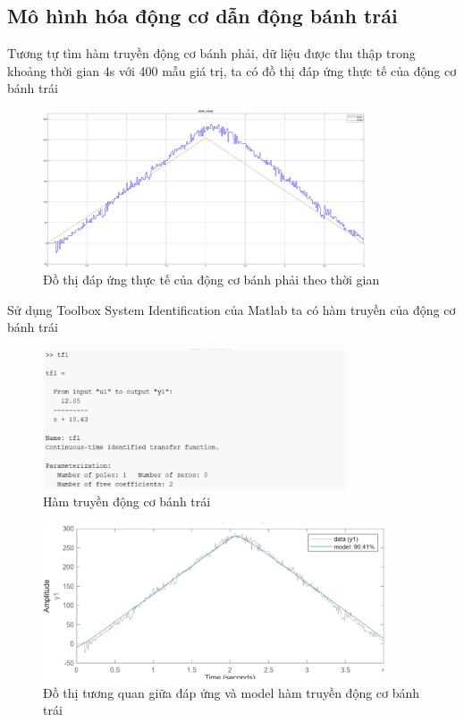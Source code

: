           \subsection{Mô hình hóa động cơ dẫn động bánh trái}
               \hspace*{0.6cm}Tương tự tìm hàm truyền động cơ bánh phải, dữ liệu được thu thập trong khoảng thời gian 4s với 400 mẫu giá trị, ta có đồ thị đáp ứng thực tế của động cơ bánh trái
               \begin{figure}[H]
                    \centering
                    \includegraphics[width=0.85\textwidth]{pictures/chapter5/CJGB2_response.png}
                    \caption{Đồ thị đáp ứng thực tế của động cơ bánh phải theo thời gian}
                    \label{CJGB2_response}
               \end{figure}  
               \hspace*{0.6cm}Sử dụng Toolbox System Identification của Matlab ta có hàm truyền của động cơ bánh trái 
               \begin{figure}[H]
                    \centering
                    \includegraphics[width=0.8\textwidth]{pictures/chapter5/CJGB2_tf.png}
                    \caption{Hàm truyền động cơ bánh trái}
                    \label{CJGB2_tf}
               \end{figure} 
               \begin{figure}[H]
                    \centering
                    \includegraphics[width=0.9\textwidth]{pictures/chapter5/CJGB2_compare.png}
                    \caption{Đồ thị tương quan giữa đáp ứng và model hàm truyền động cơ bánh trái}
                    \label{CJGB2_compare}
               \end{figure}
